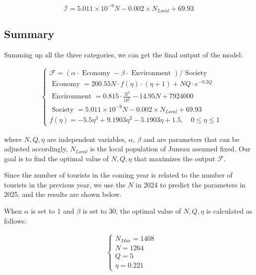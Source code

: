 \begin{equation}
    \mathcal{I}=5.011\times 10^{-9} N -0.002 \times N_{Local}+69.93
\end{equation}


\subsection{Summary}



Summing up all the three categories, we can get the final output of the model:

\begin{equation}
    \begin{aligned}
    &\left\{\begin{array}{l}
    \mathcal{F}=(\alpha \cdot \text { Economy }-\beta \cdot \text { Environment }) / \text { Society } \\[10pt]
    \text { Economy }=200.55 N \cdot f(\eta) \cdot (\eta+1)+NQ\cdot e^{-0.2 Q} \\[10pt]
    \text { Environment }=0.815 \cdot \frac{N^2}{10^5}-14.95 N+7924000 \\[10pt]
    \text { Society }=5.011\times 10^{-9} N -0.002 \times N_{Local}+69.93 \\[10pt]
    f(\eta)=-5.5 \eta^3+9.1903 \eta^2-5.1903 \eta+1.5, \quad 0 \leq \eta \leq 1
    \end{array}\right.
    \end{aligned}
\end{equation}

where $N,Q,\eta$ are independent variables, $\alpha$, $\beta$ 
and are parameters that can be adjusted accordingly, 
$N_{Local}$ is the local population of Juneau assumed fixed.
Our goal is to find the optimal value of $N,Q,\eta$ that maximizes the output $\mathcal{F}$.

Since the number of tourists in the coming year is related to the number of tourists in the previous year, 
we use the $N$ in 2024 to predict the parameters in 2025, and the results are shown below.

When $\alpha$ is set to 1 and $\beta$ is set to 30, 
the optimal value of $N,Q,\eta$ is calculated as follows:

\begin{equation}
    \begin{aligned}
    &\left\{\begin{array}{l}
    N_{Max} = 1408 \\[10pt]
    N=1264 \\[10pt]
    Q=5 \\[10pt]
    \eta=0.221
    \end{array}\right.
    \end{aligned}
\end{equation}

